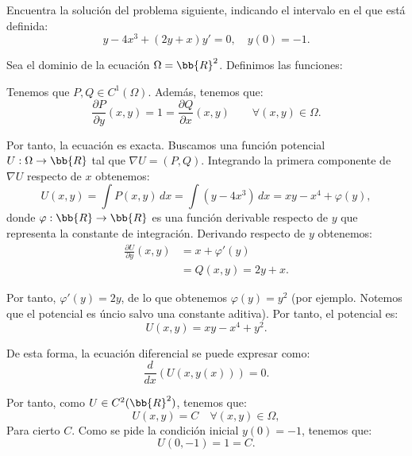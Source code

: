 \documentclass[12pt]{article}
\begin{document}
\begin{ejercicio}
    Encuentra la solución del problema siguiente, indicando el intervalo en el que está definida:
    \begin{equation*}
        y - 4x^3 + (2y + x)y' = 0, \quad y(0) = -1.
    \end{equation*}

    Sea el dominio de la ecuación $\Omega=\bb{R}^2$. Definimos las funciones:

    Tenemos que $P,Q\in C^1(\Omega)$. Además, tenemos que:
    \begin{equation*}
        \frac{\partial P}{\partial y}(x,y) = 1 = \frac{\partial Q}{\partial x}(x,y)\qquad \forall (x,y)\in \Omega.
    \end{equation*}

    Por tanto, la ecuación es exacta. Buscamos una función potencial $U:\Omega\to \bb{R}$ tal que $\nabla U = (P,Q)$.
    Integrando la primera componente de $\nabla U$ respecto de $x$ obtenemos:
    \begin{equation*}
        U(x,y) = \int P(x,y)\,dx = \int (y-4x^3)\,dx = xy - x^4 + \varphi(y),
    \end{equation*}
    donde $\varphi:\bb{R}\to \bb{R}$ es una función derivable respecto de $y$ que representa la constante de integración. Derivando respecto de $y$ obtenemos:
    \begin{align*}
        \frac{\partial U}{\partial y}(x,y) &= x + \varphi'(y)\\
        &= Q(x,y) = 2y + x.
    \end{align*}

    Por tanto, $\varphi'(y) = 2y$, de lo que obtenemos $\varphi(y) = y^2$ (por ejemplo. Notemos que el potencial es úncio salvo una constante aditiva). Por tanto, el potencial es:
    \begin{equation*}
        U(x,y) = xy - x^4 + y^2.
    \end{equation*}
    
    De esta forma, la ecuación diferencial se puede expresar como:
    \begin{equation*}
        \dfrac{d}{dx}(U(x,y(x))) = 0.
    \end{equation*}

    Por tanto, como $U\in C^2(\bb{R}^2)$, tenemos que:
    \begin{equation*}
        U(x,y) = C \quad \forall (x,y)\in \Omega,
    \end{equation*}
    Para cierto $C$. Como se pide la condición inicial $y(0) = -1$, tenemos que:
    \begin{equation*}
        U(0,-1) = 1 = C.
    \end{equation*}


\end{ejercicio}
\end{document}
